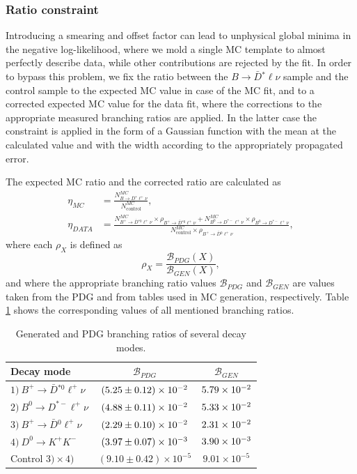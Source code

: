 \subsubsection{Ratio constraint}

Introducing a smearing and offset factor can lead to unphysical global minima in the negative log-likelihood, where we mold a single MC template to almost perfectly describe data, while other contributions are rejected by the fit. In order to bypass this problem, we fix the ratio between the  $B \to \bar D {}^* \ell \nu$ sample and the control sample to the expected MC value in case of the MC fit, and to a corrected expected MC value for the data fit, where the corrections to the appropriate measured branching ratios are applied. In the latter case the constraint is applied in the form of a Gaussian function with the mean at the calculated value and with the width according to the appropriately propagated error.

The expected MC ratio and the corrected ratio are calculated as
\begin{align}
\eta_{MC} &= \frac{N^{MC}_{B \to \bar D {}^* \ell^+ \nu}}{N^{MC}_{\mathrm{control}}},\\
\eta_{DATA} &= \frac{N^{MC}_{B^+ \to \bar D {}^{*0} \ell^+ \nu}\times \rho_{B^+ \to \bar D {}^{*0} \ell^+ \nu} + N^{MC}_{B^0 \to D^{*-} \ell^+ \nu}\times \rho_{B^0 \to D^{*-} \ell^+ \nu}}{N^{MC}_{\mathrm{control}}\times \rho_{B^+ \to \bar D {}^{0} \ell^+ \nu}},
\label{eq:ratioData}
\end{align}
where each $\rho_X$ is defined as 
\begin{equation*}
\rho_X = \frac{\mathcal{B}_{PDG}(X)}{\mathcal{B}_{GEN}(X)},
\end{equation*}
and where the appropriate branching ratio values $\mathcal{B}_{PDG}$ and $\mathcal{B}_{GEN}$ are values taken from the PDG \cite{tanabashi2018review} and from tables used in MC generation, respectively. Table \ref{tab:br} shows the corresponding values of all mentioned branching ratios.

\begin{table}[H]
	\centering
\begin{tabular}{|l|c|c|}
	\hline
	Decay mode & $\mathcal{B}_{PDG}$ & $\mathcal{B}_{GEN}$ \\
	\hline
	$1)~B^+ \to \bar D {}^{*0} \ell^+ \nu$ & $(5.25\pm0.12)\times 10^{-2}$ & $5.79\times 10^{-2}$ \\
	$2)~B^0 \to D^{*-} \ell^+ \nu$ & $(4.88\pm0.11)\times 10^{-2}$ & $5.33\times 10^{-2}$ \\
	$3)~B^+ \to \bar D {}^0 \ell^+ \nu$ & $(2.29\pm0.10)\times 10^{-2}$ & $2.31\times 10^{-2}$ \\
	$4)~D^0 \to K^+ K^-$ & $(3.97\pm0.07)\times 10^{-3}$ & $3.90\times 10^{-3}$ \\
	\hline
	Control $3) \times 4)$ & $(9.10\pm0.42)\times 10^{-5}$ & $9.01\times 10^{-5}$ \\
	\hline
\end{tabular}
	\caption{Generated and PDG branching ratios of several decay modes.}
	\label{tab:br}
\end{table}

